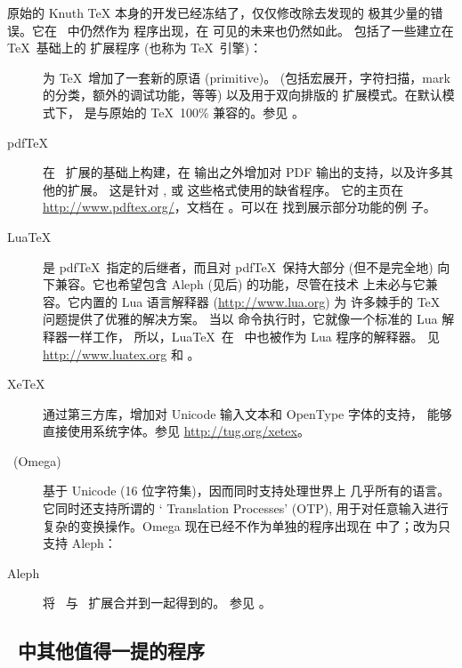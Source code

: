 \documentclass{article}
\begin{document}
原始的 Knuth \TeX{} 本身的开发已经冻结了，仅仅修改除去发现的
极其少量的错误。它在 \TL\ 中仍然作为  程序出现，在
可见的未来也仍然如此。\TL{} 包括了一些建立在 \TeX\ 基础上的
扩展程序 (也称为 \TeX\ 引擎)：

\begin{description}

\item [\eTeX] 为 \TeX\ 增加了一套新的原语 (primitive)。
\label{text:etex} (包括宏展开，字符扫描，mark 的分类，额外的调试功能，等等)
以及用于双向排版的 \TeXXeT{} 扩展模式。在默认模式下，\eTeX{} 是与原始的 \TeX\
100\% 兼容的。参见 。

\item [pdf\TeX] 在 \eTeX\ 扩展的基础上构建，在 \dvi{} 输出之外增加对
PDF 输出的支持，以及许多其他的扩展。
这是针对 ,  或  这些格式使用的缺省程序。
它的主页在 \url{http://www.pdftex.org/}，文档在
。可以在
 找到展示部分功能的例
子。

\item  [Lua\TeX] 是 pdf\TeX\ 指定的后继者，而且对 pdf\TeX\ 保持大部分
(但不是完全地) 向下兼容。它也希望包含 Aleph (见后) 的功能，尽管在技术
上未必与它兼容。它内置的 Lua 语言解释器 (\url{http://www.lua.org}) 为
许多棘手的 \TeX{} 问题提供了优雅的解决方案。
当以  命令执行时，它就像一个标准的 Lua 解释器一样工作，
所以，Lua\TeX\ 在 \TL\ 中也被作为 Lua 程序的解释器。
见 \url{http://www.luatex.org} 和 。

\item [Xe\TeX] 通过第三方库，增加对 Unicode 输入文本和 OpenType 字体的支持，
能够直接使用系统字体。参见 \url{http://tug.org/xetex}。

\item [\OMEGA\ (Omega)] 基于 Unicode (16 位字符集)，因而同时支持处理世界上
几乎所有的语言。它同时还支持所谓的 `\OMEGA{} Translation Processes' (OTP),
用于对任意输入进行复杂的变换操作。Omega 现在已经不作为单独的程序出现在 \TL{}
中了；改为只支持 Aleph：

\item [Aleph] 将 \OMEGA\ 与 \eTeX\ 扩展合并到一起得到的。
参见 。

\end{description}


\subsection{\protect\TL\ 中其他值得一提的程序}
\end{document}
